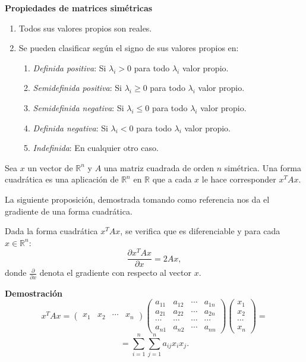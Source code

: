 \textbf{Propiedades de matrices simétricas}
\begin{enumerate}
\item Todos sus valores propios son reales.
\item Se pueden clasificar según el signo de sus valores propios en:
\begin{enumerate}
\item \textit{Definida positiva}: Si $\lambda_i > 0$ para todo $\lambda_i$ valor propio.
\item \textit{Semidefinida positiva}: Si $\lambda_i \geq 0$ para todo $\lambda_i$ valor propio.
\item \textit{Semidefinida negativa}: Si $\lambda_i \leq 0$ para todo $\lambda_i$ valor propio.
\item \textit{Definida negativa}: Si $\lambda_i < 0$ para todo $\lambda_i$ valor propio.
\item \textit{Indefinida}: En cualquier otro caso.
\end{enumerate}
\end{enumerate}

\begin{definicion}
Sea $x$ un vector de $\mathbb{R}^n$ y $A$ una matriz cuadrada de orden $n$ simétrica. Una forma cuadrática es una aplicación de $\mathbb{R}^n$ en $\mathbb{R}$ que a cada $x$ le hace corresponder $x^TAx$.
\end{definicion}

La siguiente proposición, demostrada tomando como referencia \cite{upv} nos da el gradiente de una forma cuadrática.

\begin{proposicion}
Dada la forma cuadrática $x^TAx$, se verifica que es diferenciable y para cada $x \in \mathbb{R}^n$:
\[	\frac{\partial x^TAx}{\partial x} = 2Ax,	\]
donde $\frac{\partial}{\partial x}$ denota el gradiente con respecto al vector $x$.
\end{proposicion}
\textbf{Demostración}\\
\[	x^TAx = \left( \begin{array}{cccc}
x_1 & x_2 & \cdots & x_n  \end{array} \right)
\left( \begin{array}{cccc}
a_{11} & a_{12} & \cdots & a_{1n} \\
a_{21} & a_{22} & \cdots & a_{2n} \\
\cdots & \cdots & \cdots & \cdots \\
a_{n1} & a_{n2} & \cdots & a_{nn} \end{array} \right)
\left( \begin{array}{c}
x_1 \\
x_2 \\
\cdots \\
x_n \end{array} \right) =
\]
\[ = \sum_{i=1}^n \sum_{j=1}^n a_{ij}x_ix_j.	\]

